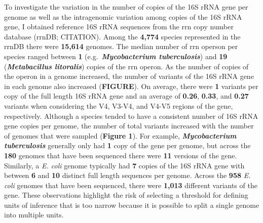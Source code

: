 \documentclass[
]{article}
\begin{document}
To investigate the variation in the number of copies of the 16S rRNA
gene per genome as well as the intragenomic variation among copies of
the 16S rRNA gene, I obtained reference 16S rRNA sequences from the rrn
copy number database (rrnDB; CITATION). Among the \textbf{4,774} species
represented in the rrnDB there were \textbf{15,614} genomes. The median
number of rrn operson per species ranged between \textbf{1}
(e.g.~\textbf{\emph{Mycobacterium tuberculosis}}) and \textbf{19}
(\textbf{\emph{Metabacillus litoralis}}) copies of the rrn operon. As
the number of copies of the operon in a genome increased, the number of
variants of the 16S rRNA gene in each genome also increased
(\textbf{FIGURE}). On average, there were \textbf{1} variants per copy
of the full length 16S rRNA gene and an average of \textbf{0.26},
\textbf{0.33}, and \textbf{0.27} variants when considering the V4,
V3-V4, and V4-V5 regions of the gene, respectively. Although a species
tended to have a consistent number of 16S rRNA gene copies per genome,
the number of total variants increased with the number of genomes that
were sampled (\textbf{Figure 1}). For example,
\textbf{\emph{Mycobacterium tuberculosis}} generally only had \textbf{1}
copy of the gene per genome, but across the \textbf{180} genomes that
have been sequenced there were \textbf{11} versions of the gene.
Similarly, a \emph{E. coli} genome typically had \textbf{7} copies of
the 16S rRNA gene with between \textbf{6} and \textbf{10} distinct full
length sequences per genome. Across the \textbf{958} \emph{E. coli}
genomes that have been sequenced, there were \textbf{1,013} different
variants of the gene. These observations highlight the risk of selecting
a threshold for defining units of inference that is too narrow because
it is possible to split a single genome into multiple units.
\end{document}
